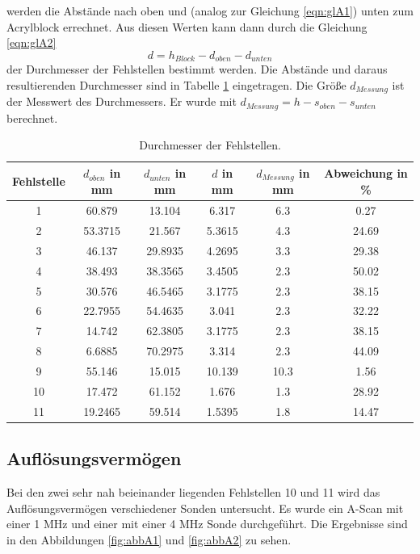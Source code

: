 werden die Abstände nach oben und (analog zur Gleichung \ref{eqn:glA1}) unten zum Acrylblock errechnet.
Aus diesen Werten kann dann durch die Gleichung \ref{eqn:glA2}
\begin{equation}
  d = h_{Block} - d_{oben} - d_{unten}
  \label{eqn:glA2}
\end{equation}
der Durchmesser der Fehlstellen bestimmt werden.
Die Abstände und daraus resultierenden Durchmesser sind in Tabelle \ref{tab:tab2} eingetragen.
Die Größe $d_{Messung}$ ist der Messwert des Durchmessers. 
Er wurde mit $d_{Messung} = h - s_{oben} - s_{unten}$ berechnet.
\begin{table}
  \centering
  \caption{Durchmesser der Fehlstellen.}
  \label{tab:tab2}
\begin{tabular}{c c c c c c}
  \toprule
  Fehlstelle & $d_{oben}$ in mm & $d_{unten}$ in mm & $d$ in mm & $d_{Messung}$ in mm & Abweichung in \%\\
  \midrule
  1  &  60.879  &  13.104 & 6.317 & 6.3 & 0.27  \\
  2  &  53.3715  &  21.567 & 5.3615 & 4.3 & 24.69  \\
  3  &  46.137  &  29.8935 & 4.2695 & 3.3 & 29.38  \\
  4  &  38.493  &  38.3565 & 3.4505 & 2.3 & 50.02  \\
  5  &  30.576  &  46.5465 & 3.1775 & 2.3 & 38.15  \\
  6  &  22.7955  &  54.4635 & 3.041 & 2.3 & 32.22  \\
  7  &  14.742  &  62.3805 & 3.1775 & 2.3 & 38.15  \\
  8  &  6.6885  &  70.2975 & 3.314 & 2.3 & 44.09  \\
  9  &  55.146  &  15.015 & 10.139 & 10.3 & 1.56  \\
  10  &  17.472  &  61.152 & 1.676 & 1.3 & 28.92  \\
  11  &  19.2465  &  59.514 & 1.5395 & 1.8 & 14.47  \\
  \bottomrule
\end{tabular}
\end{table}
\FloatBarrier

\subsection{Auflösungsvermögen}
\label{sec:auf}
Bei den zwei sehr nah beieinander liegenden Fehlstellen 10 und 11 wird das Auflösungsvermögen verschiedener Sonden untersucht.
Es wurde ein A-Scan mit einer 1 MHz und einer mit einer 4 MHz Sonde durchgeführt.
Die Ergebnisse sind in den Abbildungen \ref{fig:abbA1} und \ref{fig:abbA2} zu sehen.


